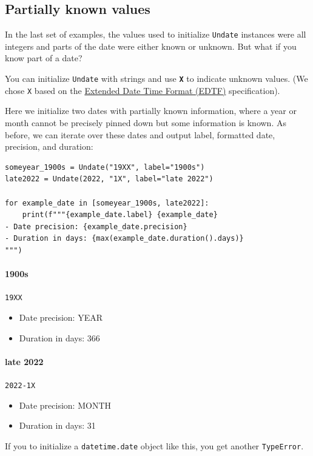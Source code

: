 \documentclass[final]{anthology-ch} %
\begin{document}
\subsection{Partially known values}

In the last set of examples, the values used to initialize \texttt{Undate} instances were all integers and parts of the date were either known or unknown. But what if you know part of a date?

You can initialize \texttt{Undate} with strings and use\textbf{ \texttt{X}} to indicate unknown values.  (We chose \texttt{X} based on the \href{https://www.loc.gov/standards/datetime/}{Extended Date Time Format (EDTF)} specification).

Here we initialize two dates with partially known information, where a year or month cannot be precisely pinned down but some information is known. As before, we can iterate over these dates and output label, formatted date, precision, and duration:

\begin{verbatim}
someyear_1900s = Undate("19XX", label="1900s")
late2022 = Undate(2022, "1X", label="late 2022")

for example_date in [someyear_1900s, late2022]:
    print(f"""{example_date.label} {example_date}
- Date precision: {example_date.precision}
- Duration in days: {max(example_date.duration().days)}
""")
\end{verbatim}

\paragraph{1900s} \texttt{19XX}
\begin{itemize}
    \item Date precision: YEAR
    \item Duration in days: 366
\end{itemize}
    
\paragraph{late 2022} \texttt{2022-1X}
\begin{itemize}
    \item Date precision: MONTH
    \item Duration in days: 31
\end{itemize}    

If you to initialize a \texttt{datetime.date} object like this, you get another \texttt{TypeError}.    
\end{document}

